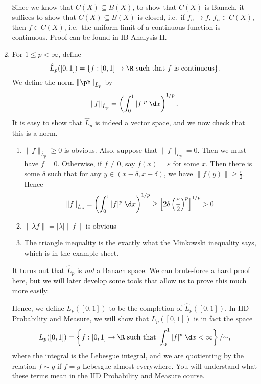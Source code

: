 \documentclass[a4paper]{article}
\begin{document}
\begin{eg}
\begin{enumerate}
      Since we know that $C(X)\subseteq B(X)$, to show that $C(X)$ is Banach, it suffices to show that $C(X) \subseteq B(X)$ is closed, i.e.\ if $f_n \to f$, $f_n \in C(X)$, then $f\in C(X)$, i.e.\ the uniform limit of a continuous function is continuous. Proof can be found in IB Analysis II.
    \item For $1 \leq p < \infty$, define
      \[
        \hat{L}_p ([0, 1]) = \{f: [0, 1] \to \R \text{ such that }f\text{ is continuous}\}.
      \]
      We define the norm $\|\ph \|_{\hat{L}_p}$ by
      \[
        \|f\|_{\hat{L}_p} = \left(\int_0^1 |f|^p \;\d x\right)^{1/p}.
      \]
      It is easy to show that $\hat{L}_p$ is indeed a vector space, and we now check that this is a norm.
      \begin{enumerate}
        \item $\|f\|_{\hat{L}_p} \geq 0$ is obvious. Also, suppose that $\|f\|_{\hat{L}_p} = 0$. Then we must have $f = 0$. Otherwise, if $f\not = 0$, say $f(x) = \varepsilon$ for some $x$. Then there is some $\delta$ such that for any $y\in (x - \delta, x + \delta)$, we have $\|f(y)\| \geq \frac{\varepsilon}{2}$. Hence
          \[
            \|f\|_{\hat{L}_p} = \left(\int_0^1 |f|^p \;\d x\right)^{1/p} \geq \left[2\delta\left(\frac{\varepsilon}{2}\right)^p\right]^{1/p} > 0.
          \]
        \item $\|\lambda f\| = |\lambda|\|f\|$ is obvious
        \item The triangle inequality is the exactly what the Minkowski inequality says, which is in the example sheet.
      \end{enumerate}
      It turns out that $\hat{L}_p$ is \emph{not} a Banach space. We can brute-force a hard proof here, but we will later develop some tools that allow us to prove this much more easily.

      Hence, we define $L_p([0, 1])$ to be the completion of $\hat{L}_p ([0, 1])$. In IID Probability and Measure, we will show that $L_p([0, 1])$ is in fact the space
      \[
        L_p([0, 1]) = \left\{f: [0, 1] \to \R\text{ such that } \int_0^1 |f|^p \;\d x < \infty\right\}/{\sim},
      \]
      where the integral is the Lebesgue integral, and we are quotienting by the relation $f\sim g$ if $f = g$ Lebesgue almost everywhere. You will understand what these terms mean in the IID Probability and Measure course.


\end{enumerate}
\end{eg}
\end{document}
